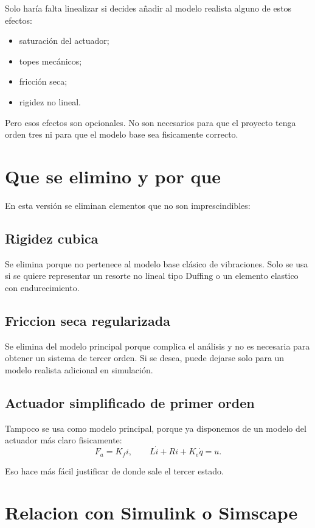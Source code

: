 \documentclass[11pt]{article}
\begin{document}
Solo har\'ia falta linealizar si decides a\~nadir al modelo realista alguno de estos efectos:

\begin{itemize}[leftmargin=1.2cm]
\item saturaci\'on del actuador;
\item topes mec\'anicos;
\item fricci\'on seca;
\item rigidez no lineal.
\end{itemize}

Pero esos efectos son opcionales. No son necesarios para que el proyecto tenga orden tres ni para que el modelo base sea fisicamente correcto.

\section{Que se elimino y por que}

En esta versi\'on se eliminan elementos que no son imprescindibles:

\subsection{Rigidez cubica}

Se elimina porque no pertenece al modelo base cl\'asico de vibraciones. Solo se usa si se quiere representar un resorte no lineal tipo Duffing o un elemento elastico con endurecimiento.

\subsection{Friccion seca regularizada}

Se elimina del modelo principal porque complica el an\'alisis y no es necesaria para obtener un sistema de tercer orden. Si se desea, puede dejarse solo para un modelo realista adicional en simulaci\'on.

\subsection{Actuador simplificado de primer orden}

Tampoco se usa como modelo principal, porque ya disponemos de un modelo del actuador m\'as claro fisicamente:
\[
F_a=K_f i,\qquad
L\dot i+Ri+K_e\dot q=u.
\]

Eso hace m\'as f\'acil justificar de donde sale el tercer estado.

\section{Relacion con Simulink o Simscape}
\end{document}
